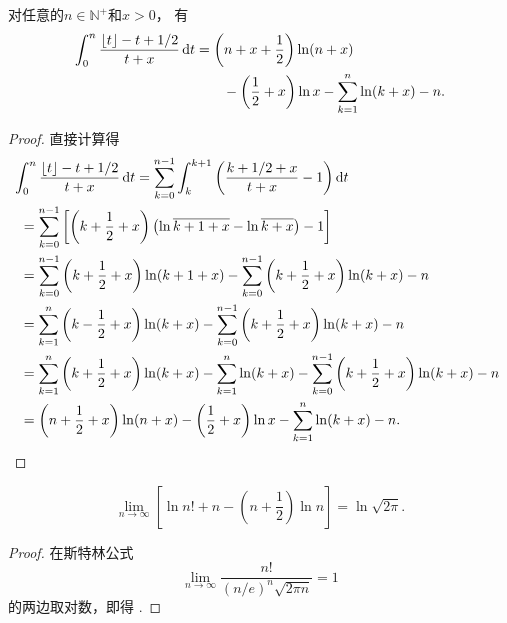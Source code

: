 \begin{lemma}\label{theorem:定积分.伽马函数的斯特灵近似.引理3}
对任意的\(n\in\mathbb{N}^+\)和\(x>0\)，
有\begin{equation}\label{equation:定积分.伽马函数的斯特灵近似.引理3}
	\begin{split}
		\int_0^n \frac{\lfloor t\rfloor - t + 1/2}{t + x} \dd{t}
		&= \left(n+x+\frac{1}{2}\right) \ln(n+x) \\
		&\hspace{20pt}
		- \left(\frac{1}{2}+x\right) \ln x
		- \sum_{k=1}^n \ln(k+x) - n.
	\end{split}
\end{equation}
\begin{proof}
直接计算得\begin{align*}
	&\hspace{-5pt}
		\int_0^n \frac{\lfloor t\rfloor - t + 1/2}{t + x} \dd{t}
		= \sum_{k=0}^{n-1} \int_k^{k+1} \left(
			\frac{k + 1/2 + x}{t + x} - 1
		\right) \dd{t} \\
	&= \sum_{k=0}^{n-1} \left[
			\left(k + \frac{1}{2} + x\right)
			\left(\ln\overline{k+1+x} - \ln\overline{k+x}\right)
			- 1
		\right] \\
	&= \sum_{k=0}^{n-1} \left(k + \frac{1}{2} + x\right) \ln(k+1+x)
		- \sum_{k=0}^{n-1} \left(k + \frac{1}{2} + x\right) \ln(k+x)
		- n \\
	&= \sum_{k=1}^n \left(k - \frac{1}{2} + x\right) \ln(k+x)
		- \sum_{k=0}^{n-1} \left(k + \frac{1}{2} + x\right) \ln(k+x)
		- n \\
	&= \sum_{k=1}^n \left(k + \frac{1}{2} + x\right) \ln(k+x)
		- \sum_{k=1}^n \ln(k+x)
		- \sum_{k=0}^{n-1} \left(k + \frac{1}{2} + x\right) \ln(k+x)
		- n \\
	&= \left(n + \frac{1}{2} + x\right) \ln(n+x)
		- \left(\frac{1}{2} + x\right) \ln x
		- \sum_{k=1}^n \ln(k+x)
		- n.
	\qedhere
\end{align*}
\end{proof}
\end{lemma}

\begin{lemma}\label{theorem:定积分.伽马函数的斯特灵近似.引理4}
\begin{equation}\label{equation:定积分.伽马函数的斯特灵近似.引理4}
\lim_{n\to\infty} \left[
\ln n! + n - \left(n+\frac{1}{2}\right) \ln n
\right]
= \ln\sqrt{2\pi}.
\end{equation}
\begin{proof}
在斯特林公式\[
\lim_{n\to\infty} \frac{n!}{(n/e)^n \sqrt{2\pi n}} = 1
\]的两边取对数，即得 .
\end{proof}
\end{lemma}

